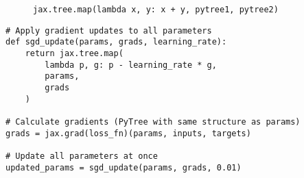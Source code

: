 \begin{frame}
\begin{figure}
\caption{\texttt{jax.tree.map(lambda x, y: x + y, pytree1, pytree2)}}
\end{figure}

\end{frame}


\begin{frame}[fragile]
    
    \begin{verbatim}
# Apply gradient updates to all parameters
def sgd_update(params, grads, learning_rate):
    return jax.tree.map(
        lambda p, g: p - learning_rate * g, 
        params, 
        grads
    )

# Calculate gradients (PyTree with same structure as params)
grads = jax.grad(loss_fn)(params, inputs, targets)

# Update all parameters at once
updated_params = sgd_update(params, grads, 0.01)    
    \end{verbatim}

\end{frame}


